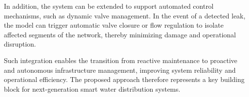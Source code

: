 \vspace{0.2cm}

\noindent In addition, the system can be extended to support automated control mechanisms,
such as dynamic valve management. In the event of a detected leak, the model
can trigger automatic valve closure or flow regulation to isolate affected
segments of the network, thereby minimizing damage and operational disruption.

\vspace{0.2cm}

\noindent Such integration enables the transition from reactive maintenance to proactive
and autonomous infrastructure management, improving system reliability and
operational efficiency. The proposed approach therefore represents a key
building block for next-generation smart water distribution systems.